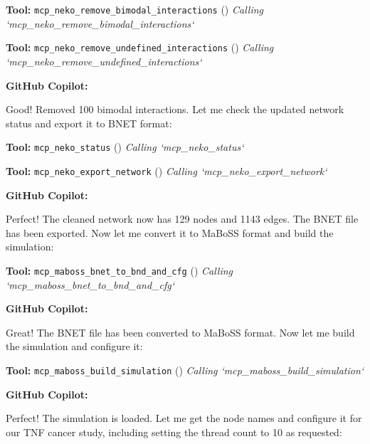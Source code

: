 \documentclass[11pt,a4paper]{article}
\begin{document}
\begin{toolokbox}
\textbf{Tool:} \texttt{mcp\_neko\_remove\_bimodal\_interactions} (\checkmark)
\textit{Calling `mcp\_neko\_remove\_bimodal\_interactions`}
\end{toolokbox}
\begin{toolokbox}
\textbf{Tool:} \texttt{mcp\_neko\_remove\_undefined\_interactions} (\checkmark)
\textit{Calling `mcp\_neko\_remove\_undefined\_interactions`}
\end{toolokbox}
\begin{copilotbox}
\textbf{GitHub Copilot:}

Good! Removed 100 bimodal interactions. Let me check the updated network status and export it to BNET format:

\end{copilotbox}
\begin{toolokbox}
\textbf{Tool:} \texttt{mcp\_neko\_status} (\checkmark)
\textit{Calling `mcp\_neko\_status`}
\end{toolokbox}
\begin{toolokbox}
\textbf{Tool:} \texttt{mcp\_neko\_export\_network} (\checkmark)
\textit{Calling `mcp\_neko\_export\_network`}
\end{toolokbox}
\begin{copilotbox}
\textbf{GitHub Copilot:}

Perfect! The cleaned network now has 129 nodes and 1143 edges. The BNET file has been exported. Now let me convert it to MaBoSS format and build the simulation:

\end{copilotbox}
\begin{toolokbox}
\textbf{Tool:} \texttt{mcp\_maboss\_bnet\_to\_bnd\_and\_cfg} (\checkmark)
\textit{Calling `mcp\_maboss\_bnet\_to\_bnd\_and\_cfg`}
\end{toolokbox}
\begin{copilotbox}
\textbf{GitHub Copilot:}

Great! The BNET file has been converted to MaBoSS format. Now let me build the simulation and configure it:

\end{copilotbox}
\begin{toolokbox}
\textbf{Tool:} \texttt{mcp\_maboss\_build\_simulation} (\checkmark)
\textit{Calling `mcp\_maboss\_build\_simulation`}
\end{toolokbox}
\begin{copilotbox}
\textbf{GitHub Copilot:}

Perfect! The simulation is loaded. Let me get the node names and configure it for our TNF cancer study, including setting the thread count to 10 as requested:

\end{copilotbox}
\end{document}
